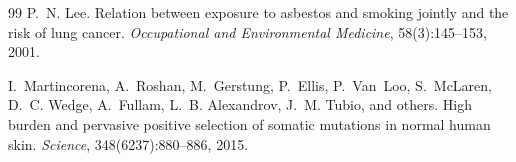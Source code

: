 \documentclass[11pt]{article}
\theoremstyle{definition}
\theoremstyle{remark}
\begin{document}
\begin{thebibliography}{99}
P.~N. Lee.
\newblock Relation between exposure to asbestos and smoking jointly
  and the risk of lung cancer.
\newblock \emph{Occupational and Environmental Medicine},
  58(3):145--153, 2001.

I.~Martincorena, A.~Roshan, M.~Gerstung, P.~Ellis, P.~Van~Loo,
  S.~McLaren, D.~C. Wedge, A.~Fullam, L.~B. Alexandrov, J.~M. Tubio,
  and others.
\newblock High burden and pervasive positive selection of somatic
  mutations in normal human skin.
\newblock \emph{Science}, 348(6237):880--886, 2015.

\end{thebibliography}
\end{document}
